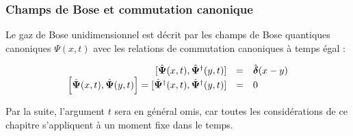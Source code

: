
\subsubsection{Champs de Bose et commutation canonique}

Le gaz de Bose unidimensionnel est décrit par les champs de Bose quantiques canoniques \( \Psi(x, t) \) avec les relations de commutation canoniques à temps égal :


\begin{eqnarray}
	\left . \begin{array}{rcl}
		[ \hat{\bm{\Psi}}(x, t),  \hat{\bm{\Psi}}^\dagger(y, t) ]  &=&  \hat{\bm{\delta}}(x - y) \\
		\left [ \hat{\bm{\Psi}}(x, t),  \hat{\bm{\Psi}}(y, t) \right ]   =  [ \hat{\bm{\Psi}}^\dag(x, t),  \hat{\bm{\Psi}}^\dag(y, t) ]  &=&  0 
	\end{array} \right . \label{eq.1.1}
\end{eqnarray}

Par la suite, l'argument \( t \) sera en général omis, car toutes les considérations de ce chapitre s'appliquent à un moment fixe dans le temps.